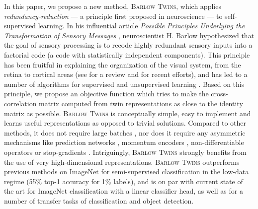 \documentclass{article}
\newcommand{\AlgoName}{\textsc{Barlow Twins}}
\begin{document}
In this paper, we propose a new method, \AlgoName{}, which applies \emph{redundancy-reduction} --- a principle first proposed in neuroscience --- to self-supervised learning. In his influential article \emph{Possible Principles Underlying the Transformation of Sensory Messages} \citep{barlow_possible_nodate}, neuroscientist H. Barlow hypothesized that the goal of sensory processing is to recode highly redundant sensory inputs into a factorial code (a code with statistically independent components). This principle has been fruitful in explaining the organization of the visual system, from the retina to cortical areas (see \citep{barlow_redundancy_2001} for a review and \citep{ocko_emergence_2018,lindsey_unified_2020,schwartz_natural_2001} for recent efforts), and has led to a number of algorithms for supervised and unsupervised learning \citep{redlich_redundancy_1993,redlich_supervised_1993,deco_non-linear_1997,foldiak_forming_1990,linsker_self-organization_1988,schmidhuber_semilinear_1996,balle_end--end_2017}. Based on this principle, we propose an objective function which tries to make the cross-correlation matrix computed from twin representations as close to the identity matrix as possible. \AlgoName{} is conceptually simple, easy to implement and learns useful representations as opposed to trivial solutions. Compared to other methods, it does not require large batches \cite{chen2020simple}, nor does it require any asymmetric mechanisms like prediction networks \cite{grill2020bootstrap}, momentum encoders \cite{he2019momentum}, non-differentiable operators \cite{caron2020swav} or stop-gradients \cite{chen2020exploring}. Intriguingly, \AlgoName{} strongly benefits from the use of very high-dimensional representations. \AlgoName{} outperforms previous methods on ImageNet for semi-supervised classification in the low-data regime (55\% top-1 accuracy for 1\% labels), and is on par with current state of the art for ImageNet classification with a linear classifier head, as well as for a number of transfer tasks of classification and object detection. 
\end{document}
